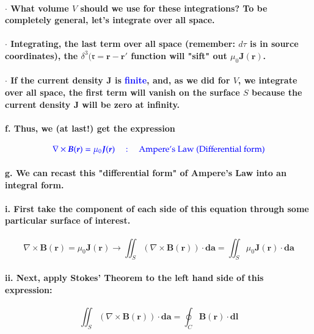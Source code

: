 \documentclass{article}
\begin{document}
\paragraph{\indent\indent $\cdot$ What volume $V$ should we use for these integrations? To be completely general, let's integrate over all space.}
\paragraph{\indent\indent $\cdot$ Integrating, the last term over all space (remember: $d\tau$ is in source coordinates), the $\delta^3(\boldsymbol{\mathfrak{r}}=\boldsymbol{r}-\boldsymbol{r}'$ function will "sift" out $\mu_0\boldsymbol{J}(\boldsymbol{r})$.}
\paragraph{\indent\indent $\cdot$ If the current density $\boldsymbol{J}$ is \textcolor{blue}{finite}, and, as we did for $V$, we integrate over all space, the first term will vanish on the surface $S$ because the current density $\boldsymbol{J}$ will be zero at infinity.}
\paragraph{\indent f. Thus, we (at last!) get the expression }
\begin{equation*}
    \textcolor{blue}{\nabla\times\boldsymbol{B}(\boldsymbol{r})=\mu_0\boldsymbol{J}(\boldsymbol{r})\quad:\quad \text{Ampere's Law (Differential form)}}
\end{equation*}
\paragraph{\indent g. We can recast this "differential form" of Ampere's Law into an integral form.}
\paragraph{\indent\indent i. First take the component of each side of this equation through some particular surface of interest.}
\begin{equation*}
    \nabla\times\boldsymbol{B}(\boldsymbol{r})=\mu_0\boldsymbol{J}(\boldsymbol{r})\rightarrow\iint_S(\nabla\times\boldsymbol{B}(\boldsymbol{r}))\cdot\boldsymbol{da}=\iint_S\mu_0\boldsymbol{J}(\boldsymbol{r})\cdot\boldsymbol{da}
\end{equation*}
\paragraph{\indent\indent ii. Next, apply Stokes' Theorem to the left hand side of this expression:}
\begin{equation*}
    \iint_S(\nabla\times\boldsymbol{B}(\boldsymbol{r}))\cdot\boldsymbol{da}=\oint_C \boldsymbol{B}(\boldsymbol{r})\cdot\boldsymbol{dl}
\end{equation*}
\end{document}
